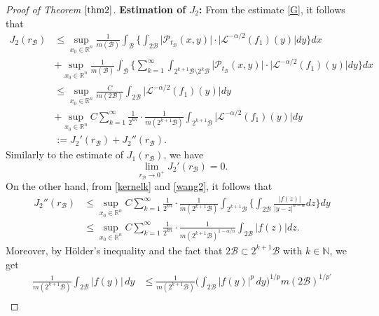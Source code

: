 \documentclass[10pt, reqno]{amsart}
\theoremstyle{definition}
\theoremstyle{remark}
\numberwithin{equation}{section}
\begin{document}
\begin{proof}[Proof of Theorem $\ref{thm2}$]
\textbf{Estimation of $J_2$:} From the estimate \eqref{G}, it follows that
\begin{equation*}
\begin{split}
J_2(r_{\mathcal{B}})
&\leq\sup_{x_0\in\mathbb R^n}\frac{1}{m(\mathcal{B})}\int_{\mathcal{B}}
\bigg\{\int_{2\mathcal{B}}\big|\mathcal{P}_{t_{\mathcal{B}}}(x,y)\big|\cdot\big|\mathcal{L}^{-\alpha/2}(f_1)(y)\big|dy\bigg\}dx\\
&+\sup_{x_0\in\mathbb R^n}\frac{1}{m(\mathcal{B})}\int_{\mathcal{B}}
\bigg\{\sum_{k=1}^{\infty}\int_{2^{k+1}\mathcal{B}\setminus 2^k \mathcal{B}}\big|\mathcal{P}_{t_{\mathcal{B}}}(x,y)\big|\cdot\big|\mathcal{L}^{-\alpha/2}(f_1)(y)\big|dy\bigg\}dx\\
&\leq\sup_{x_0\in\mathbb R^n}\frac{C}{m(2\mathcal{B})}\int_{2\mathcal{B}}\big|\mathcal{L}^{-\alpha/2}(f_1)(y)\big|dy\\
&+\sup_{x_0\in\mathbb R^n}
C\sum_{k=1}^{\infty}\frac{1}{2^{kn}}\cdot\frac{1}{m(2^{k+1}\mathcal{B})}\int_{2^{k+1}\mathcal{B}}\big|\mathcal{L}^{-\alpha/2}(f_1)(y)\big|dy\\
&:=J_2'(r_{\mathcal{B}})+J_2''(r_{\mathcal{B}}).
\end{split}
\end{equation*}
Similarly to the estimate of $J_1(r_{\mathcal{B}})$, we have
\begin{equation*}
\lim_{r_{\mathcal{B}}\to 0^{+}}J_2'(r_{\mathcal{B}})=0.
\end{equation*}
On the other hand, from \eqref{kernelk} and \eqref{wang2}, it follows that
\begin{equation*}
\begin{split}
J_2''(r_{\mathcal{B}})&\leq \sup_{x_0\in\mathbb R^n}
C\sum_{k=1}^{\infty}\frac{1}{2^{kn}}\cdot\frac{1}{m(2^{k+1}\mathcal{B})}\int_{2^{k+1}\mathcal{B}}  \bigg\{\int_{2\mathcal{B}}\frac{|f(z)|}{|y-z|^{n-\alpha}}dz\bigg\}dy\\
&\leq \sup_{x_0\in\mathbb R^n}
C\sum_{k=1}^{\infty}\frac{1}{2^{kn}}\cdot\frac{1}{m(2^{k+1}\mathcal{B})^{1-\alpha/n}}\int_{2\mathcal{B}}|f(z)|dz.
\end{split}
\end{equation*}
Moreover, by H\"{o}lder's inequality and the fact that $2\mathcal{B}\subset 2^{k+1}\mathcal{B}$ with $k\in \mathbb{N}$, we get
\begin{equation*}
\begin{split}
\frac{1}{m(2^{k+1}\mathcal{B})}\int_{2\mathcal{B}}|f(y)|\,dy
&\leq\frac{1}{m(2^{k+1}\mathcal{B})}\bigg(\int_{2\mathcal{B}}|f(y)|^p\,dy\bigg)^{1/p}m(2\mathcal{B})^{1/{p'}}\\

\end{split}
\end{equation*}
\end{proof}
\end{document}
